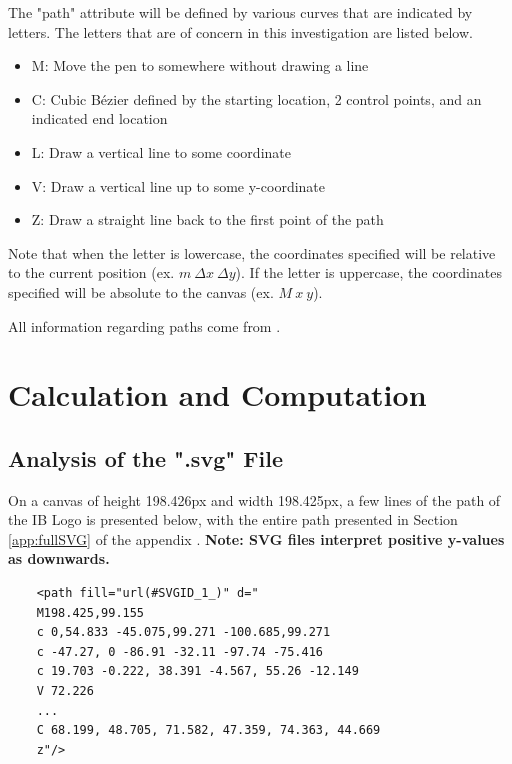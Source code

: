 \documentclass[letterpaper, 12pt]{article}
\begin{document}
The "path" attribute will be defined by various curves that are indicated
by letters. The letters that are of concern in this investigation are
listed below.
\begin{itemize}
    \item M: Move the pen to somewhere without drawing a line
    \item C: Cubic Bézier defined by the starting location, 2 control points, and an indicated end location
    \item L: Draw a vertical line to some coordinate
    \item V: Draw a vertical line up to some y-coordinate
    \item Z: Draw a straight line back to the first point of the path
\end{itemize}

Note that when the letter is lowercase, the coordinates specified will
be relative to the current position (ex. \(m~\Delta x~\Delta y\)). If the letter is uppercase, the
coordinates specified will be absolute to the canvas (ex. \(M~x~y\)).

All information regarding paths come from \cite{mozilladevelopernetworkPathsSVGScalable2023}.




\section{Calculation and Computation}

\subsection{Analysis of the ".svg" File} \label{svgAnalysis}

On a canvas of height 198.426px and width 198.425px,
a few lines of the path of the IB Logo is presented below,
with the entire path presented in Section \ref*{app:fullSVG}
of the appendix
\cite{internationalbaccalaureateorganisationInternationalBaccalaureateLogo2013}. \textbf{Note: SVG files interpret positive y-values as downwards.}

\begin{verbatim}
    <path fill="url(#SVGID_1_)" d="
    M198.425,99.155
    c 0,54.833 -45.075,99.271 -100.685,99.271
    c -47.27, 0 -86.91 -32.11 -97.74 -75.416
    c 19.703 -0.222, 38.391 -4.567, 55.26 -12.149
    V 72.226
    ...
    C 68.199, 48.705, 71.582, 47.359, 74.363, 44.669
    z"/>
\end{verbatim}
\end{document}
